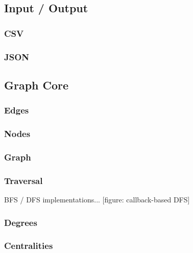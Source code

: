 	\subsection{Input / Output}
	\label{ssect:input_output}
	
		\subsubsection{CSV}
		\label{sssection: io_csv}
		
		\subsubsection{JSON}
		\label{sssection: io_json}
	
	\subsection{Graph Core}
	\label{ssect:graph_core}
	
		\subsubsection{Edges}
		\label{sssection: core_edges}
		
		\subsubsection{Nodes}
		\label{sssection: core_nodes}
		
		\subsubsection{Graph}
		\label{sssection: core_graph}
		
		\subsubsection{Traversal}
		\label{sssection: core_traveral}
		
		BFS / DFS implementations... [figure: callback-based DFS]
		
		\subsubsection{Degrees}
		\label{sssection: core_degrees}
		
		\subsubsection{Centralities}
		\label{sssection: core_centralities}
		
